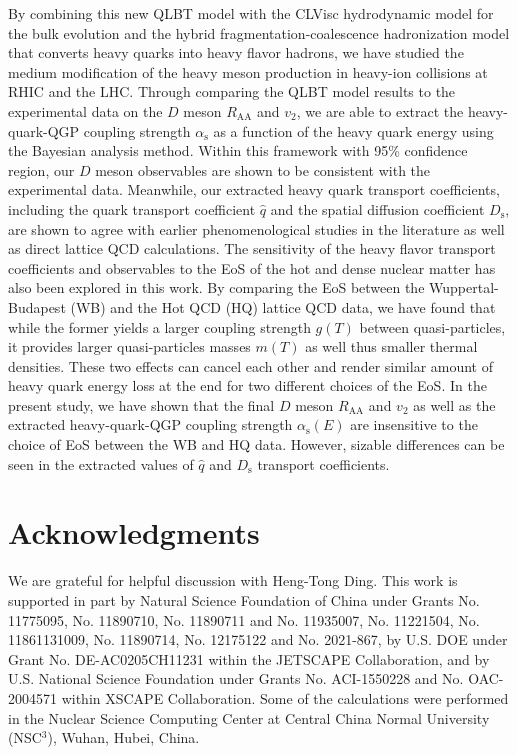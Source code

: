 \documentclass[aps,superscriptaddress,prc,twocolumn,nofootinbib]{revtex4}
\begin{document}
By combining this new QLBT model with the CLVisc hydrodynamic model for the bulk evolution and the hybrid fragmentation-coalescence hadronization model that converts heavy quarks into heavy flavor hadrons, we have studied the medium modification of the heavy meson production in heavy-ion collisions at RHIC and the LHC. Through comparing the QLBT model results to the experimental data on the $D$ meson $R_\mathrm{AA}$ and $v_2$, we are able to extract the heavy-quark-QGP coupling strength $\alpha_\mathrm{s}$ as a function of the heavy quark energy using the Bayesian analysis method. Within this framework with 95\% confidence region, our $D$ meson observables are shown to be consistent with the experimental data. Meanwhile, our extracted heavy quark transport coefficients, including the quark transport coefficient $\hat{q}$ and the spatial diffusion coefficient $D_\mathrm{s}$, are shown to agree with earlier phenomenological studies in the literature as well as direct lattice QCD calculations. The sensitivity of the heavy flavor transport coefficients and observables to the EoS of the hot and dense nuclear matter has also been explored in this work. By comparing the EoS between the Wuppertal-Budapest (WB) and the Hot QCD (HQ) lattice QCD data, we have found that while the former yields a larger coupling strength $g(T)$ between quasi-particles, it provides larger quasi-particles masses $m(T)$ as well thus smaller thermal densities. These two effects can cancel each other and render similar amount of heavy quark energy loss at the end for two different choices of the EoS.
In the present study, we have shown that the final $D$ meson $R_\mathrm{AA}$ and $v_2$ as well as the extracted heavy-quark-QGP coupling strength $\alpha_\mathrm{s}(E)$ are insensitive to the choice of EoS between the WB and HQ data.
However, sizable differences can be seen in the extracted values of $\hat{q}$ and $D_\mathrm{s}$ transport coefficients.



\section*{Acknowledgments}

We are grateful for helpful discussion with Heng-Tong Ding. This work is supported in part by Natural Science Foundation of China under Grants No. 11775095, No. 11890710, No. 11890711 and No. 11935007, No. 11221504, No. 11861131009, No. 11890714, No. 12175122 and No. 2021-867, by U.S. DOE under Grant No. DE-AC0205CH11231 within the JETSCAPE Collaboration, and by U.S. National Science Foundation under Grants No. ACI-1550228 and No. OAC-2004571 within XSCAPE Collaboration.
Some of the calculations were performed in the Nuclear Science Computing Center at Central China Normal University (NSC$^3$), Wuhan, Hubei, China.



\end{document}
